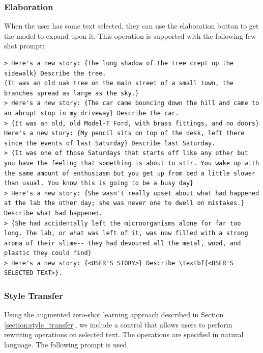 \subsubsection{Elaboration}
When the user has some text selected, they can use the elaboration button to get the model to expand upon it.
This operation is supported with the following few-shot prompt:

\begin{lstlisting}
> Here's a new story: {The long shadow of the tree crept up the sidewalk} Describe the tree.
{It was an old oak tree on the main street of a small town, the branches spread as large as the sky.}
> Here's a new story: {The car came bouncing down the hill and came to an abrupt stop in my driveway} Describe the car.
> {It was an old, old Model-T Ford, with brass fittings, and no doors}
Here's a new story: {My pencil sits on top of the desk, left there since the events of last Saturday} Describe last Saturday.
> {It was one of those Saturdays that starts off like any other but you have the feeling that something is about to stir. You wake up with the same amount of enthusiasm but you get up from bed a little slower than usual. You know this is going to be a busy day}
> Here's a new story: {She wasn't really upset about what had happened at the lab the other day; she was never one to dwell on mistakes.} Describe what had happened.
> {She had accidentally left the microorganisms alone for far too long. The lab, or what was left of it, was now filled with a strong aroma of their slime-- they had devoured all the metal, wood, and plastic they could find}
> Here's a new story: {<USER'S STORY>} Describe \textbf{<USER'S SELECTED TEXT>}.
\end{lstlisting}

\subsubsection{Style Transfer}
Using the augmented zero-shot learning approach described in Section \ref{section:style_transfer}, we include a control that allows users to perform rewriting operations on selected text. The operations are specified in natural language.
The following prompt is used.

